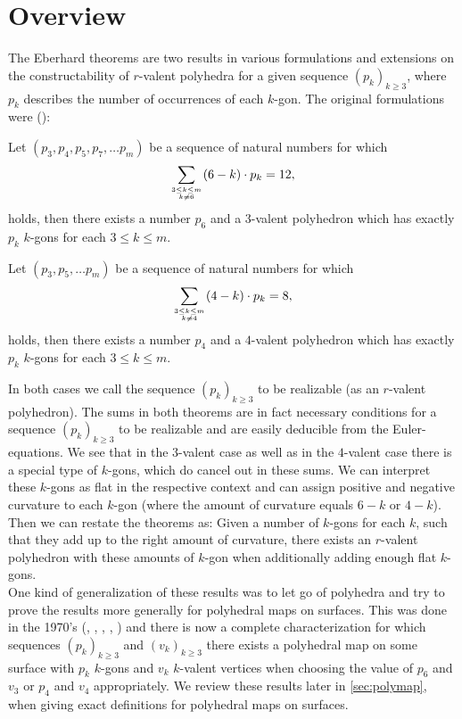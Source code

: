 \section{Overview}

The {\sc Eberhard} theorems are two results in various formulations and extensions on the constructability of $r$-valent polyhedra for a given sequence $(p_k)_{k \geq 3}$, where $p_k$ describes the number of occurrences of each $k$-gon. The original formulations were (\cite{ConvexPolytopes}):
\begin{theorem}\label{thm:eberhard:3} Let $(p_3, p_4, p_5, p_7, \dots p_m)$ be a sequence of natural numbers for which
\begin{align*}
  \sum_{3 \leq k \leq m \atop k \neq 6}(6 - k) \cdot p_k = 12,
\end{align*}
holds, then there exists a number $p_6$ and a $3$-valent polyhedron which has exactly $p_k$ $k$-gons for each $3 \leq k \leq m$.
\end{theorem}
\begin{theorem}\label{thm:eberhard:4} Let $(p_3,  p_5, \dots p_m)$ be a sequence of natural numbers for which
\begin{align*}
  \sum_{3 \leq k \leq m \atop k \neq 4}(4 - k) \cdot p_k = 8,
\end{align*}
holds, then there exists a number $p_4$ and a $4$-valent polyhedron which has exactly $p_k$ $k$-gons for each $3 \leq k \leq m$.
\end{theorem}
In both cases we call the sequence $(p_k)_{k \geq 3}$ to be realizable (as an $r$-valent polyhedron). The sums in both theorems are in fact necessary conditions for a sequence $(p_k)_{k \geq 3}$ to be realizable and are easily deducible from the {\sc Euler}-equations. We see that in the $3$-valent case as well as in the $4$-valent case there is a special type of $k$-gons, which do cancel out in these sums. We can interpret these $k$-gons as flat in the respective context and can assign positive and negative curvature to each $k$-gon (where the amount of curvature equals $6 - k$ or $4 - k$). Then we can restate the theorems as: Given a number of $k$-gons for each $k$, such that they add up to the right amount of curvature, there exists an $r$-valent polyhedron with these amounts of $k$-gon when additionally adding enough flat $k$-gons.\\

One kind of generalization of these results was to let go of polyhedra and try to prove the results more generally for polyhedral maps on surfaces. This was done in the 1970's (\cite{jendrol1977generalization}, \cite{jucovivc1973theorem}, \cite{barnette1971toroidal}, \cite{grunbaum1969planar}, \cite{zaks1971analogue}) and there is now a complete characterization for which sequences $(p_k)_{k\geq 3}$ and $(v_k)_{k \geq 3}$ there exists a polyhedral map on some surface with $p_k$ $k$-gons and $v_k$ $k$-valent vertices when choosing the value of $p_6$ and $v_3$ or $p_4$ and $v_4$ appropriately. We review these results later in \autoref{sec:polymap}, when giving exact definitions for polyhedral maps on surfaces.\\

